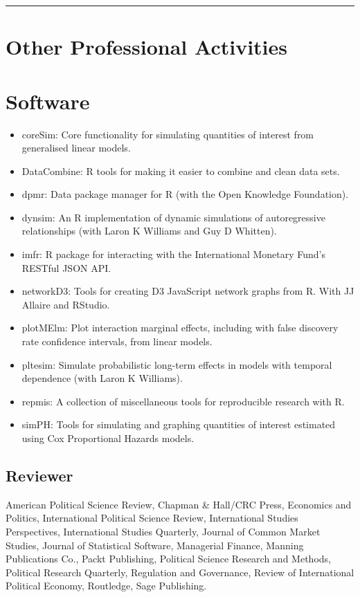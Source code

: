 \documentclass[a4paper]{article}
\begin{document}
{%
\vspace{0.25cm}
\medskip\hrule height 1pt
\vspace{0.5cm}

\section*{Other Professional Activities}

\section*{Software}

\begin{itemize}
    \item coreSim: Core functionality for simulating quantities of interest from generalised linear models.
    \item DataCombine: R tools for making it easier to combine and clean data sets.
    \item dpmr: Data package manager for R (with the Open Knowledge Foundation).
    \item dynsim: An R implementation of dynamic simulations of autoregressive relationships (with Laron K Williams and Guy D Whitten).
    \item imfr: R package for interacting with the International Monetary Fund's RESTful JSON API.
    \item networkD3: Tools for creating D3 JavaScript network graphs from R. With JJ Allaire and RStudio.
    \item plotMElm: Plot interaction marginal effects, including with false discovery rate confidence intervals, from linear models.
    \item pltesim: Simulate probabilistic long-term effects in models with temporal dependence (with Laron K Williams).
    \item repmis: A collection of miscellaneous tools for reproducible research with R.
    \item simPH: Tools for simulating and graphing quantities of interest estimated using Cox Proportional Hazards models.
\end{itemize}

\subsection*{Reviewer}

American Political Science Review, Chapman \& Hall/CRC Press, Economics and Politics,
International Political Science Review, International Studies Perspectives, International Studies Quarterly,
Journal of Common Market Studies, Journal of Statistical Software,
Managerial Finance, Manning Publications Co.,
Packt Publishing, Political Science Research and Methods, Political Research
Quarterly, Regulation and Governance, Review of International Political Economy,
Routledge, Sage Publishing.

}
\end{document}
